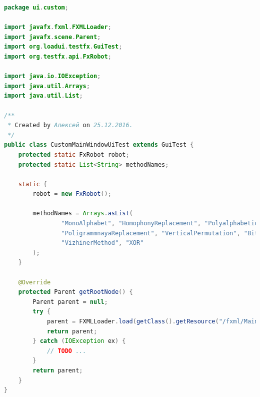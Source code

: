 \documentclass[a4paper,12pt]{article}
\begin{document}
\begin{lstlisting}[language=java, caption=код модуля CustomMainWindowUiTest.java]
package ui.custom;

import javafx.fxml.FXMLLoader;
import javafx.scene.Parent;
import org.loadui.testfx.GuiTest;
import org.testfx.api.FxRobot;

import java.io.IOException;
import java.util.Arrays;
import java.util.List;

/**
 * Created by Алексей on 25.12.2016.
 */
public class CustomMainWindowUiTest extends GuiTest {
    protected static FxRobot robot;
    protected static List<String> methodNames;

    static {
        robot = new FxRobot();

        methodNames = Arrays.asList(
                "MonoAlphabet", "HomophonyReplacement", "PolyalphabeticReplacement",
                "PoligrammnayaReplacement", "VerticalPermutation", "BitRevers",
                "VizhinerMethod", "XOR"
        );
    }

    @Override
    protected Parent getRootNode() {
        Parent parent = null;
        try {
            parent = FXMLLoader.load(getClass().getResource("/fxml/MainWindow.fxml"));
            return parent;
        } catch (IOException ex) {
            // TODO ...
        }
        return parent;
    }
}
\end{lstlisting}
\end{document}
